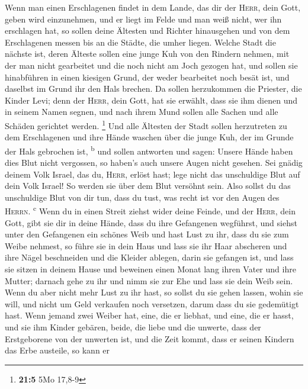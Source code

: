  Wenn man einen Erschlagenen findet in dem Lande, das dir
der \textsc{Herr}, dein Gott, geben wird einzunehmen, und er liegt im
Felde und man weiß nicht, wer ihn erschlagen hat,  so
sollen deine Ältesten und Richter hinausgehen und von dem Erschlagenen
messen bis an die Städte, die umher liegen.  Welche Stadt
die nächste ist, deren Älteste sollen eine junge Kuh von den Rindern
nehmen, mit der man nicht gearbeitet und die noch nicht am Joch gezogen
hat,  und sollen sie hinabführen in einen kiesigen Grund,
der weder bearbeitet noch besät ist, und daselbst im Grund ihr den Hals
brechen.  Da sollen herzukommen die Priester, die Kinder
Levi; denn der \textsc{Herr}, dein Gott, hat sie erwählt, dass sie ihm
dienen und in seinem Namen segnen, und nach ihrem Mund sollen alle
Sachen und alle Schäden gerichtet werden. \footnote{\textbf{21:5} 5Mo
  17,8-9}  Und alle Ältesten der Stadt sollen herzutreten
zu dem Erschlagenen und ihre Hände waschen über die junge Kuh, der im
Grunde der Hals gebrochen ist, \textsuperscript{b}  und
sollen antworten und sagen: Unsere Hände haben dies Blut nicht
vergossen, so haben's auch unsere Augen nicht gesehen. 
Sei gnädig deinem Volk Israel, das du, \textsc{Herr}, erlöst hast; lege
nicht das unschuldige Blut auf dein Volk Israel! So werden sie über dem
Blut versöhnt sein.  Also sollst du das unschuldige Blut
von dir tun, dass du tust, was recht ist vor den Augen des
\textsc{Herrn}. \textsuperscript{c}  Wenn du in einen
Streit ziehst wider deine Feinde, und der \textsc{Herr}, dein Gott, gibt
sie dir in deine Hände, dass du ihre Gefangenen wegführst,
 und siehst unter den Gefangenen ein schönes Weib und
hast Lust zu ihr, dass du sie zum Weibe nehmest,  so
führe sie in dein Haus und lass sie ihr Haar abscheren und ihre Nägel
beschneiden  und die Kleider ablegen, darin sie gefangen
ist, und lass sie sitzen in deinem Hause und beweinen einen Monat lang
ihren Vater und ihre Mutter; darnach gehe zu ihr und nimm sie zur Ehe
und lass sie dein Weib sein.  Wenn du aber nicht mehr
Lust zu ihr hast, so sollst du sie gehen lassen, wohin sie will, und
nicht um Geld verkaufen noch versetzen, darum dass du sie gedemütigt
hast.  Wenn jemand zwei Weiber hat, eine, die er liebhat,
und eine, die er hasst, und sie ihm Kinder gebären, beide, die liebe und
die unwerte, dass der Erstgeborene von der unwerten ist, 
und die Zeit kommt, dass er seinen Kindern das Erbe austeile, so kann er
